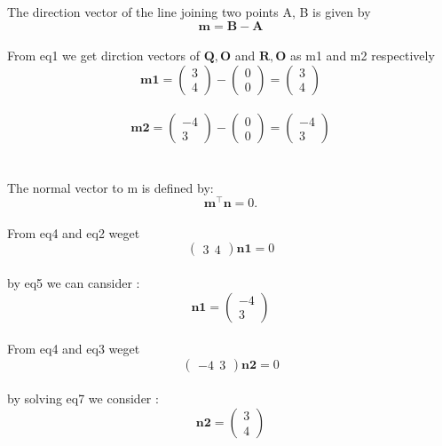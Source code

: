 \documentclass[journal,12pt,twocolumn]{article}
\newcommand{\myvec}[1]{\ensuremath{\begin{pmatrix}#1\end{pmatrix}}}
\let\vec\mathbf
\begin{document}
The direction vector of the line joining two points A, B is given by
\\

\begin{equation}
	\vec{m}=
     \vec{B}-  \vec{A}
  \label{eq-1}
\end{equation}
\\
From eq1 we get dirction vectors of ${\vec{Q},\vec{O}}$ and ${\vec{R},\vec{O}}$ as m1 and m2 respectively 
\\
\begin{equation}
	\vec{m1}=
     \myvec{
  3\\
  4
 }-  \myvec{
  0\\
  0
 }= \myvec{3\\4}
  \label{eq-2}
\end{equation}
\\
\begin{equation}
	\vec{m2}=
     \myvec{
  -4\\
  3
 }- \myvec{0\\0} = \myvec{-4\\3}
   \label{eq-3}
\end{equation}
\\
\\
The normal vector to m is defined by:
\\
\begin{equation}
\vec{m^{\top}}\vec{n} = 0.
  \label{eq-4}
\end{equation} 
\\
From eq4 and eq2 weget
 \\
 \begin{equation}
	\myvec{3\ \ 4}
     \vec{n1}= 0
  \label{eq-5}
\end{equation}
\\
by eq5 we can cansider :
\begin{equation}	
     \vec{n1}= \myvec{-4\\ 3}
  \label{eq-6}
\end{equation}  
\\
From eq4 and eq3 weget
\begin{equation}
	\myvec{-4\ \ 3}
     \vec{n2} = 0
   \label{eq-7}
\end{equation}
\\
by solving eq7 we consider :
\begin{equation}	
     \vec{n2}= \myvec{3\\ 4}
  \label{eq-8}
\end{equation}  
\\
\end{document}
